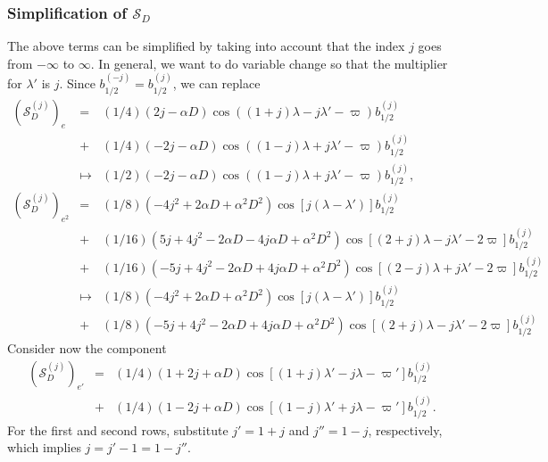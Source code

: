 \documentclass [12pt, a4paper] {article}
\begin{document}
\subsubsection{Simplification of $\mathcal{S}_D$}
The above terms can be simplified by taking into account that the index 
$j$ goes from $-\infty$ to $\infty$. In general, we want to do variable 
change so that the multiplier for $\lambda'$ is $j$.
Since $b_{1/2}^{(-j)} = b_{1/2}^{(j)}$, we can replace
\begin {eqnarray}
    \left(\mathcal{S}_D^{(j)}\right)_e &=& 
    (1/4)\left(2j-\alpha D\right)\cos((1+j)\lambda - j\lambda' - \varpi)
    b_{1/2}^{(j)}
    \\\nonumber
    &+& 
    (1/4)\left(-2j-\alpha D\right)\cos((1-j)\lambda + j\lambda' - \varpi) 
    b_{1/2}^{(j)}
    \\
    &\mapsto& 
    (1/2)\left(-2j-\alpha D\right)\cos((1-j)\lambda + j\lambda' - \varpi)
    b_{1/2}^{(j)},
    \\
    \left(\mathcal{S}_D^{(j)}\right)_{e^2} &=& 
    (1/8)\left(-4j^2 + 2\alpha D + \alpha^2D^2\right)\cos[j(\lambda - \lambda')]
    b_{1/2}^{(j)}
    \\\nonumber
    &+& 
    (1/16)\left(5j + 4j^2 - 2\alpha D - 4j\alpha D + \alpha^2D^2\right)
    \cos[(2 + j)\lambda - j\lambda' - 2\varpi]
    b_{1/2}^{(j)}
    \\\nonumber
    &+& 
    (1/16)\left(-5j + 4j^2 -2\alpha D + 4j\alpha D + \alpha^2D^2\right)
    \cos[(2 - j)\lambda + j\lambda' - 2\varpi]
    b_{1/2}^{(j)}
    \\
    &\mapsto&
    (1/8)\left(-4j^2 + 2\alpha D + \alpha^2D^2\right)\cos[j(\lambda - \lambda')]
    b_{1/2}^{(j)}
    \\\nonumber
    &+& 
    (1/8)\left(-5j + 4j^2 - 2\alpha D + 4j\alpha D + \alpha^2D^2\right)
    \cos[(2 + j)\lambda - j\lambda' - 2\varpi]
    b_{1/2}^{(j)}
\end {eqnarray}
Consider now the component
\begin {eqnarray}
    \left(\mathcal{S}_D^{(j)}\right)_{e'} &=& 
    (1/4)
    \left(
        1 + 2j + \alpha D
    \right)
    \cos[(1 + j)\lambda' - j\lambda - \varpi']
    b_{1/2}^{(j)}
    \\\nonumber 
    &+&
    (1/4)
    \left(
        1 - 2j + \alpha D
    \right)
    \cos[(1 - j)\lambda' + j\lambda - \varpi']
    b_{1/2}^{(j)}.
\end {eqnarray}
For the first and second rows, substitute $j' = 1+j$ and $j''=1-j$, respectively,
which implies $j = j' - 1 = 1 - j''$.
\end{document}
